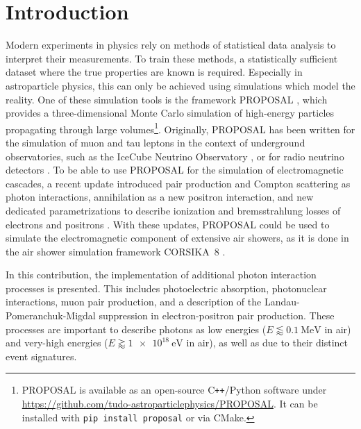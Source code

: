 \section{Introduction}

Modern experiments in physics rely on methods of statistical data analysis to interpret their measurements.
To train these methods, a statistically sufficient dataset where the true properties are known is required.
Especially in astroparticle physics, this can only be achieved using simulations which model the reality.
One of these simulation tools is the framework PROPOSAL \cite{KOEHNE20132070}, which provides a three-dimensional Monte Carlo simulation of high-energy particles propagating through large volumes\footnote{PROPOSAL is available as an open-source C\texttt{++}/Python software under \url{https://github.com/tudo-astroparticlephysics/PROPOSAL}. It can be installed with \texttt{pip install proposal} or via CMake.}.
Originally, PROPOSAL has been written for the simulation of muon and tau leptons in the context of underground observatories, such as the IceCube Neutrino Observatory \cite{IceCube:2021uhz}, or for radio neutrino detectors \cite{PhysRevD.102.083011}.
To be able to use PROPOSAL for the simulation of electromagnetic cascades, a recent update introduced pair production and Compton scattering as photon interactions, annihilation as a new positron interaction, and new dedicated parametrizations to describe ionization and bremsstrahlung losses of electrons and positrons \cite{Alameddine:2021iq}.
With these updates, PROPOSAL could be used to simulate the electromagnetic component of extensive air showers, as it is done in the air shower simulation framework CORSIKA~8 \cite{icrc2023}. 

In this contribution, the implementation of additional photon interaction processes is presented.
This includes photoelectric absorption, photonuclear interactions, muon pair production, and a description of the Landau-Pomeranchuk-Migdal suppression in electron-positron pair production.
These processes are important to describe photons as low energies ($E \lessapprox \SI{0.1}{\mega\electronvolt}$ in air) and very-high energies ($E \gtrapprox \SI{1e18}{\electronvolt}$ in air), as well as due to their distinct event signatures.